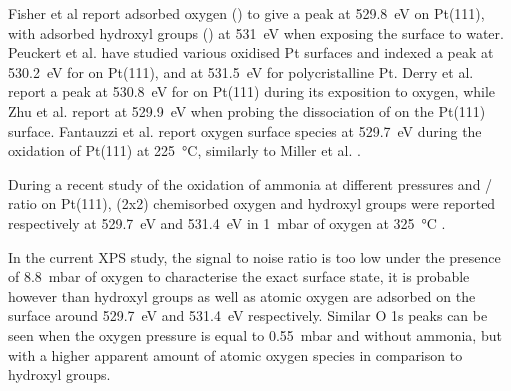 Fisher et al \parencite*{Fisher1980} report adsorbed oxygen () to give a peak at \qty{529.8}{\eV} on Pt(111), with adsorbed hydroxyl groups () at \qty{531}{\eV} when exposing the surface to water.
Peuckert et al. \parencite*{Peuckert1984} have studied various oxidised Pt surfaces and indexed a peak at \qty{530.2}{\eV} for  on Pt(111), and  at \qty{531.5}{\eV} for polycristalline Pt.
Derry et al. \parencite*{Derry1984} report a peak at \qty{530.8}{\eV} for  on Pt(111) during its exposition to oxygen, while Zhu et al. \parencite*{Zhu2003} report  at \qty{529.9}{\eV} when probing the dissociation of  on the Pt(111) surface.
Fantauzzi et al. \parencite*{Fantauzzi2017} report oxygen surface species at \qty{529.7}{\eV} during the oxidation of Pt(111) at \qty{225}{\degreeCelsius}, similarly to Miller et al. \parencite*{Miller2014}.

During a recent study of the oxidation of ammonia at different pressures and / ratio on Pt(111), (2x2) chemisorbed oxygen and hydroxyl groups were reported respectively at \qty{529.7}{\eV} and \qty{531.4}{\eV} in \qty{1}{\milli\bar} of oxygen at \qty{325}{\degreeCelsius} \parencite{Ivashenko2021}.

In the current XPS study, the signal to noise ratio is too low under the presence of \qty{8.8}{\milli\bar} of oxygen to characterise the exact surface state, it is probable however than hydroxyl groups as well as atomic oxygen are adsorbed on the surface around \qty{529.7}{\eV} and \qty{531.4}{\eV} respectively.
Similar O 1s peaks can be seen when the oxygen pressure is equal to \qty{0.55}{\milli\bar} and without ammonia, but with a higher apparent amount of atomic oxygen species in comparison to hydroxyl groups.

